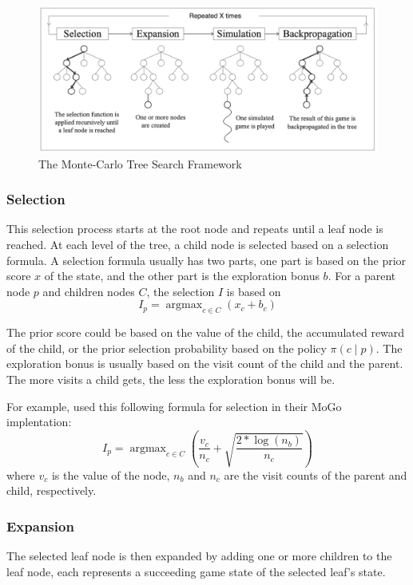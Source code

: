 \documentclass[12pt]{article}
\begin{document}
\begin{figure}[h]
    \centering
    \includegraphics[scale=0.5]{assets/mcts.png}
    \caption[]{The Monte-Carlo Tree Search Framework}
    \label{fig:mcts}
\end{figure}

\subsubsection{Selection}
This selection process starts at the root node and repeats until a leaf node is reached.
At each level of the tree, a child node is selected based on a selection formula.
A selection formula usually has two parts, one part is based on the prior score $x$ of the state, and the other part is the exploration bonus $b$.
For a parent node $p$ and children nodes $C$, the selection $I$ is based on
\begin{equation}
    \label{eq:MCTS_selection}
    I_p = \operatorname{argmax}_{c \in C} \left( x_c + b_c \right)
\end{equation}

The prior score could be based on the value of the child, the accumulated reward of the child, or the prior selection probability based on the policy $\pi(c \mid p)$.
The exploration bonus is usually based on the visit count of the child and the parent.
The more visits a child gets, the less the exploration bonus will be.

For example, \citeauthor{ModificationUCTPatterns_Gelly.Wang.ea_2006} used this following formula for selection in their MoGo implentation:
$$
    I_p = \operatorname{argmax}_{c \in C} \left( \frac{v_c}{n_c} + \sqrt{\frac{2 * \log(n_b)}{n_c} } \right)
$$
where $v_c$ is the value of the node, $n_b$ and $n_c$ are the visit counts of the parent and child, respectively.

\subsubsection{Expansion}
The selected leaf node is then expanded by adding one or more children to the leaf node, each represents a succeeding game state of the selected leaf's state.
\end{document}
